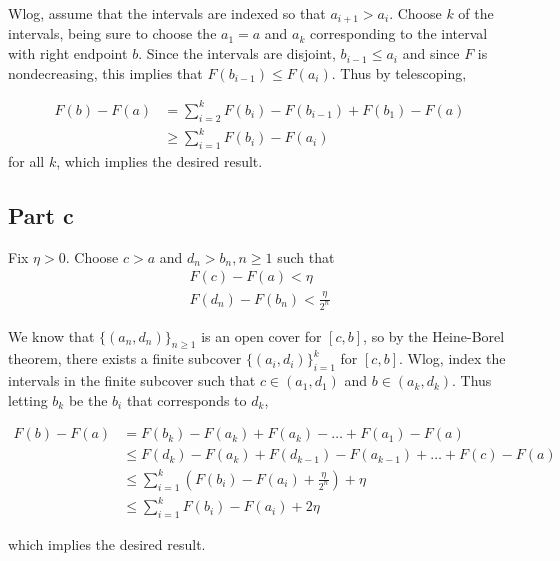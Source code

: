 \documentclass{article}
\begin{document}
Wlog, assume that the intervals are indexed so that $a_{i+1} > a_i$. Choose $k$ of the intervals, being sure to choose the $a_1 = a$ and $a_k$ corresponding to the interval with right endpoint $b$. Since the intervals are disjoint, $b_{i-1} \leq a_i$ and since $F$ is nondecreasing, this implies that $F(b_{i-1}) \leq F(a_i)$. Thus by telescoping,

\begin{align*}
F(b) - F(a) &= \sum_{i=2}^k F(b_i) - F(b_{i-1}) + F(b_1) - F(a) \\
&\geq \sum_{i=1}^k F(b_i) - F(a_i)
\end{align*}
for all $k$, which implies the desired result.

\subsection*{Part c}

Fix $\eta > 0$. Choose $c>a$ and $d_n > b_n, n \geq 1$ such that
\begin{gather*}
F(c) - F(a) < \eta \\
F(d_n) - F(b_n) < \frac{\eta}{2^n}
\end{gather*}

We know that $\{(a_n, d_n)\}_{n \geq 1}$ is an open cover for $[c, b]$, so by the Heine-Borel theorem, there exists a finite subcover $\{(a_i, d_i)\}_{i=1}^k$ for $[c, b]$. Wlog, index the intervals in the finite subcover such that $c \in (a_1, d_1)$ and $b \in (a_k, d_k)$. Thus letting $b_k$ be the $b_i$ that corresponds to $d_k$,

\begin{align*}
F(b) - F(a) &= F(b_k) - F(a_k) + F(a_k) - \dots +F(a_1) - F(a) \\
&\leq F(d_k) - F(a_k) + F(d_{k-1}) - F(a_{k-1}) + \dots + F(c) - F(a) \\
&\leq \sum_{i=1}^k \left(F(b_i) - F(a_i) + \frac{\eta}{2^n}\right) + \eta \\
&\leq \sum_{i=1}^k F(b_i) - F(a_i) + 2\eta
\end{align*}

which implies the desired result.
\end{document}
